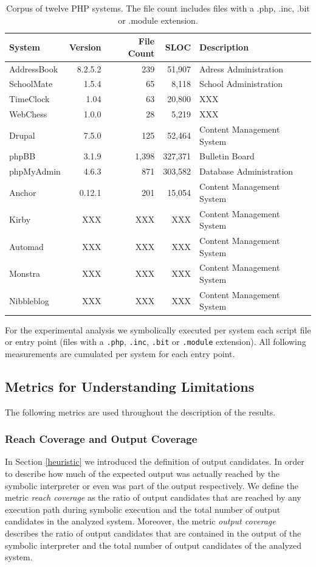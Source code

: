 \documentclass[preprint]{sig-alternate-05-2015}
\begin{document}
\begin{table}[t]
\centering 
	\begin{tabular}{p{4cm}rrrl}
	\toprule
	\textbf{System} & \textbf{Version} & \textbf{File Count} & \textbf{SLOC} &
	\textbf{Description}
	\\
	\midrule
	AddressBook & 8.2.5.2 & 239 & 51,907 & Adress Administration \\
	SchoolMate & 1.5.4 & 65 & 8,118 & School Administration \\
	TimeClock & 1.04 & 63 & 20,800 & XXX \\
	WebChess & 1.0.0 & 28 & 5,219 & XXX \\
	\midrule
	Drupal & 7.5.0 & 125 & 52,464 & Content Management System \\
	phpBB & 3.1.9 & 1,398 & 327,371 & Bulletin Board \\
	phpMyAdmin & 4.6.3 & 871 & 303,582 & Database Administration \\
	\midrule
	Anchor & 0.12.1 & 201 & 15,054 & Content Management System \\
	Kirby & XXX & XXX & XXX & Content Management System \\
	Automad & XXX & XXX & XXX & Content Management System \\
	Monstra & XXX & XXX & XXX & Content Management System \\
	Nibbleblog & XXX & XXX & XXX & Content Management System \\
	\bottomrule
	\end{tabular}
	\caption{Corpus of twelve PHP systems. The file count includes files with a .php,
	.inc, .bit or .module extension.}
	\label{corpus}
\end{table}

For the experimental analysis we symbolically executed per system each script file or entry point (files with a \texttt{.php}, \texttt{.inc}, \texttt{.bit} or \texttt{.module} extension). All following measurements are cumulated per system for each entry point. 

\subsection{Metrics for Understanding Limitations} \label{metrics}
The following metrics are used throughout the description of the results. 

\subsubsection{Reach Coverage and Output Coverage} \label{coverage_section}
In Section \ref{heuristic} we introduced the definition of output candidates. In
order to describe how much of the expected output was actually reached by the
symbolic interpreter or even was part of the output respectively.
We define the metric \emph{reach coverage} as the ratio of output candidates
that are reached by any execution path during symbolic execution and the total
number of output candidates in the analyzed system. Moreover, the metric \emph{output coverage} describes the ratio of output
candidates that are contained in the output of the symbolic interpreter and the total
number of output candidates of the analyzed system. 
\end{document}
